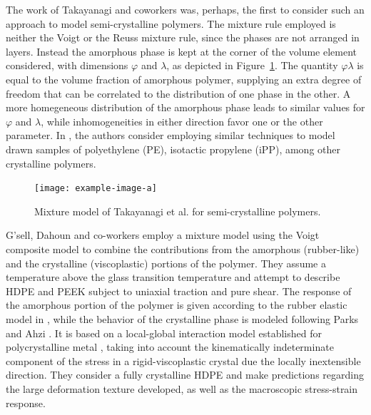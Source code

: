 The work of Takayanagi and coworkers \citep{ takayanagiApplicationEquivalentModel1964} was, perhaps, the first to consider such an approach to model semi-crystalline polymers.
The mixture rule employed is neither the Voigt or the Reuss mixture rule, since the phases are not arranged in layers.
Instead the amorphous phase is kept at the corner of the volume element considered, with dimensions $\varphi$ and $\lambda$, as depicted in Figure~\ref{fig:model_takayanagi}.
The quantity $\varphi \lambda$ is equal to the volume fraction of amorphous polymer, supplying an extra degree of freedom that can be correlated to the distribution of one phase in the other.
A more homegeneous distribution of the amorphous phase leads to similar values for $\varphi$ and $\lambda$, while inhomogeneities in either direction favor one or the other parameter.
In \cite{takayanagiMechanicalPropertiesFine1967}, the authors consider employing similar techniques to model drawn samples of polyethylene (PE), isotactic propylene (iPP), among other crystalline polymers.
\begin{figure}
	\centering
	\texttt{[image: example-image-a]}
	\caption{Mixture model of Takayanagi et al. \citep{takayanagiApplicationEquivalentModel1964} for semi-crystalline polymers.}
\label{fig:model_takayanagi}
\end{figure}

G'sell, Dahoun and co-workers \citep{gsellEvolutionMicrostructureSemicrystalline1994, dahounPlasticBehaviorDeformation1995} employ a mixture model using the Voigt composite model to combine the contributions from the amorphous (rubber-like) and the crystalline (viscoplastic) portions of the polymer.
They assume a temperature above the glass transition temperature and attempt to describe HDPE and PEEK subject to uniaxial traction and pure shear.
The response of the amorphous portion of the polymer is given according to the rubber elastic model in \cite{wuImprovedNetworkModels1993}, while the behavior of the crystalline phase is modeled following Parks and Ahzi \citep{parksPolycrystallinePlasticDeformation1990}.
It is based on a local-global interaction model established for polycrystalline metal \citep{molinariSelfConsistentApproach1987}, taking into account the kinematically indeterminate component of the stress in a rigid-viscoplastic crystal due the locally inextensible direction.
They consider a fully crystalline HDPE and make predictions regarding the large deformation texture developed, as well as the macroscopic stress-strain response.

